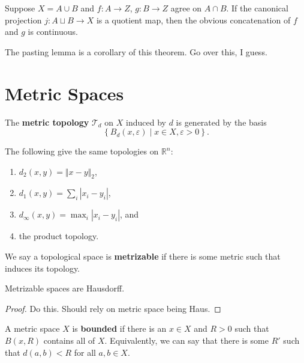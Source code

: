 \documentclass[twoside,10pt]{report}
\begin{document}
\begin{thrm}
	Suppose $X = A \cup B$ and $f:A\to Z$, $g:B\to Z$ agree on $A \cap B$. If the canonical projection $j: A \sqcup B \to X$ is a quotient map, then the obvious concatenation of $f$ and $g$ is continuous.
\end{thrm}

The pasting lemma is a corollary of this theorem. {\color{red}Go over this, I guess.}


\section{Metric Spaces}

\begin{defn}[]
The \textbf{metric topology} $\mathcal{T}_{d}$ on $X$ induced by $d$ is generated by the basis
\[
	\left\{ B_{d}(x,\varepsilon) \;|\; x \in X, \varepsilon>0 \right\}.
\] 
\end{defn}

\begin{prop}
The following give the same topologies on $\mathbb{R}^n$:
\begin{enumerate}
	\item $d_2(x,y) = {\Vert{x-y}\Vert}_{2}$,
	\item $d_1(x,y)=\sum_i |x_i-y_i|$,
	\item $d_{\infty}(x,y) = \max_{i}|x_i-y_i|$, and
	\item the product topology.
\end{enumerate}
\end{prop}

We say a topological space is \textbf{metrizable} if there is some metric such that induces its topology.

\begin{prop}
Metrizable spaces are Hausdorff.
\end{prop}
\begin{proof}
	{\color{red}Do this. Should rely on metric space being Haus.}
\end{proof}

A metric space $X$ is \textbf{bounded} if there is an $x \in X$ and $R>0$ such that $B(x,R)$ contains all of $X$. Equivalently, we can say that there is some $R'$ such that $d(a,b) < R$ for all $a,b \in X$.

\end{document}
